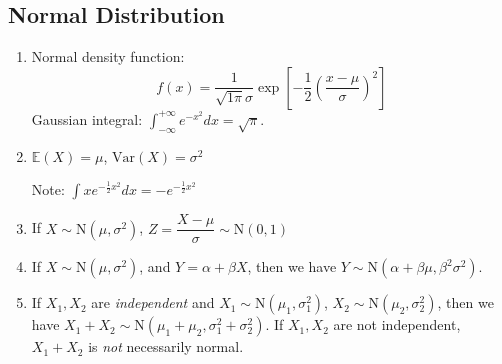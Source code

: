 \documentclass[%
 aip,
 jmp,%
 amsmath,amssymb,
 reprint,%
]{revtex4-1}
\newenvironment{note}{\color{gray}\footnotesize}{}
\def\E{\mathbb{E}}
\def\Var{\mathrm{Var}}
\def\normal{\mathrm{N}}
\begin{document}
\subsection{Normal Distribution}
\begin{enumerate}
  \item Normal density function:
      $$ f(x)=\frac{1}{\sqrt{1\pi}\sigma}\exp\left[-\frac{1}{2}\left(\frac{x-\mu}{\sigma}\right)^2\right]$$
      \begin{note}
        Gaussian integral: $\int_{-\infty}^{+\infty}e^{-x^2}dx=\sqrt{\pi}$.
      \end{note}

  \item $\E(X) = \mu$, $\Var(X)=\sigma^2$

    \begin{note}
      Note: $\int x e^{-\frac{1}{2}x^2}dx = - e^{-\frac{1}{2}x^2}$
    \end{note}

  \item If $X \sim \normal(\mu, \sigma^2)$, $Z=\dfrac{X-\mu}{\sigma}\sim\normal(0,1)$
  \item If $X \sim \normal(\mu,\sigma^2)$, and $Y=\alpha+\beta X$, then we have
  $Y \sim \normal(\alpha + \beta\mu, \beta^2 \sigma^2)$.

  \item If $X_1,X_2$ are \emph{independent} and $X_1 \sim \normal(\mu_1,\sigma_1^2)$,
  $X_2 \sim \normal(\mu_2,\sigma_2^2)$, then we have $X_1+X_2 \sim \normal(\mu_1+\mu_2, \sigma_1^2+\sigma_2^2)$.
  If $X_1,X_2$ are not independent, $X_1+X_2$ is \emph{not} necessarily normal.
\end{enumerate}
\end{document}
